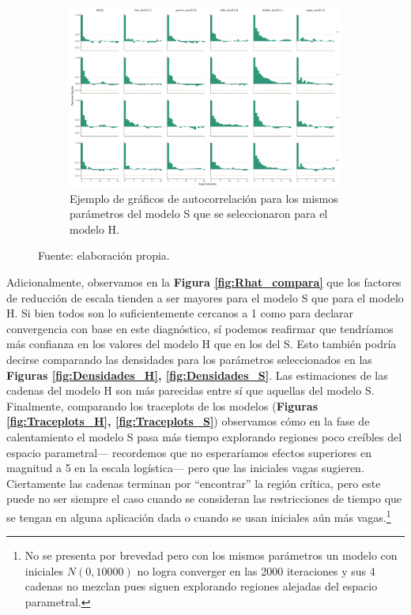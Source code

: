 \begin{figure}
\begin{subfigure}{0.6\textwidth}
	\includegraphics[width = \textwidth]{Figs/Convergencia/Convergencia_AutoCorr_S}
	\caption{Ejemplo de gráficos de autocorrelación para los mismos parámetros del modelo S que se seleccionaron para el modelo H.}
	\label{fig:Autocorr_S}
	\end{subfigure}
	\caption{Fuente: elaboración propia.}
\end{figure} 
 
 Adicionalmente, observamos en la \textbf{Figura \ref{fig:Rhat_compara}} que los factores de reducción de escala tienden a ser mayores para el modelo S que para el modelo H. Si bien todos son lo suficientemente cercanos a 1 como para declarar convergencia con base en este diagnóstico, sí podemos reafirmar que tendríamos más confianza en los valores del modelo H que en los del S. Esto también podría decirse comparando las densidades para los parámetros seleccionados en las \textbf{Figuras  \ref{fig:Densidades_H}, \ref{fig:Densidades_S}}. Las estimaciones de las cadenas del modelo H son más parecidas entre sí que aquellas del modelo S. Finalmente, comparando los traceplots de los modelos (\textbf{Figuras  \ref{fig:Traceplots_H}, \ref{fig:Traceplots_S}}) observamos cómo en la fase de calentamiento el modelo S pasa más tiempo explorando regiones poco creíbles del espacio parametral--- recordemos que no esperaríamos efectos superiores en magnitud a 5 en la escala logística--- pero que las iniciales vagas sugieren. Ciertamente las cadenas terminan por ``encontrar'' la región crítica, pero este puede no ser siempre el caso cuando se consideran las restricciones de tiempo que se tengan en alguna aplicación dada o cuando se usan iniciales aún más vagas.\footnote{No se presenta por brevedad pero con los mismos parámetros un modelo con iniciales $N(0,10000)$ no logra converger en las 2000 iteraciones y sus 4 cadenas no mezclan pues siguen explorando regiones alejadas del espacio parametral.}\\ 
  
